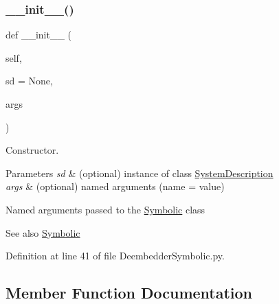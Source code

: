 \subsubsection{\texorpdfstring{\+\_\+\+\_\+init\+\_\+\+\_\+()}{\_\_init\_\_()}}
{\footnotesize\ttfamily def \+\_\+\+\_\+init\+\_\+\+\_\+ (\begin{DoxyParamCaption}\item[{}]{self,  }\item[{}]{sd = {\ttfamily None},  }\item[{}]{args }\end{DoxyParamCaption})}



Constructor. 


\begin{DoxyParams}{Parameters}
{\em sd} & (optional) instance of class \hyperlink{namespaceSignalIntegrity_1_1SystemDescriptions_1_1SystemDescription}{System\+Description} \\
\hline
{\em args} & (optional) named arguments (name = value)\\
\hline
\end{DoxyParams}
Named arguments passed to the \hyperlink{namespaceSignalIntegrity_1_1SystemDescriptions_1_1Symbolic}{Symbolic} class

\begin{DoxySeeAlso}{See also}
\hyperlink{namespaceSignalIntegrity_1_1SystemDescriptions_1_1Symbolic}{Symbolic} 
\end{DoxySeeAlso}


Definition at line 41 of file Deembedder\+Symbolic.\+py.



\subsection{Member Function Documentation}
\mbox{\label{classSignalIntegrity_1_1SystemDescriptions_1_1DeembedderSymbolic_1_1DeembedderSymbolic_a10ef812418fff67deff1540435a9698c}} 
